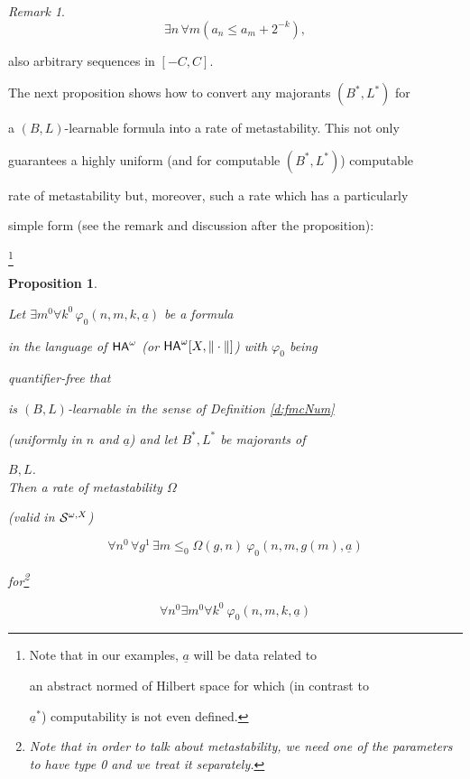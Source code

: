 \documentclass[1p]{elsarticle}
\newcommand{\usftext}[1]{\textsf{\upshape #1}}
\newcommand{\ha}{\ensuremath{{\usftext{HA}}^\omega}} %
\theoremstyle{plain}
\newtheorem{prop}[thm]{Proposition}
\theoremstyle{definition}
\theoremstyle{remark}
\newtheorem*{remark}{Remark}
\renewcommand{\phi}{\varphi}
\theoremstyle{definition}
\begin{document}
{\begin{remark}
\[ \exists n\,\forall m (a_n\le a_m+2^{-k}), \] 

also arbitrary sequences in $[-C,C].$

\end{remark}

The next proposition shows how to convert any majorants $(B^*,L^*)$ for 

a $(B,L)$-learnable formula into a rate of metastability. This not only 

guarantees a highly uniform (and for computable $(B^*,L^*)$) computable 

rate of metastability but, moreover, such a rate which has a particularly 

simple form (see the remark and discussion after the proposition):

\footnote{Note that in our examples, $\underline{a}$ will be data related to 

an abstract normed of Hilbert space for which (in contrast to 

$\underline{a}^*$) computability is not even defined.} 

\begin{prop}\label{p:bg2meta}

Let $\exists m^0\forall k^0\,\varphi_0(n,m,k,\underline{a})$ be a formula 

in the language of $\ha$ (or $\ha[X,\|\cdot\|]$) with $\varphi_0$ being 

quantifier-free that 

is $(B,L)$-learnable in the sense of Definition \ref{d:fmcNum}  

(uniformly in $n$ and  $\underline{a}$) and let $B^*,L^*$ be majorants of  

$B,L$. \\ 

Then a rate of metastability $\Omega$ 

(valid in ${\cal S}^{\omega,X}$) 

\[ \forall n^0\,\forall g^1\, \exists m\le_0\Omega(g,n) \ 

\phi_0(n,m,g(m),\underline{a})\tag{metastable} \label{(metastable)}\]

for\footnote{Note that in order to talk about metastability, we need  one of the parameters to have type 0 and we treat it separately.}  

\[

\forall n^0 \exists m^0 \forall k^0\ \phi_0(n,m,k,\underline{a})\tag{$\phi$}\label{e:phi}

\]


\end{prop}}
\end{document}

